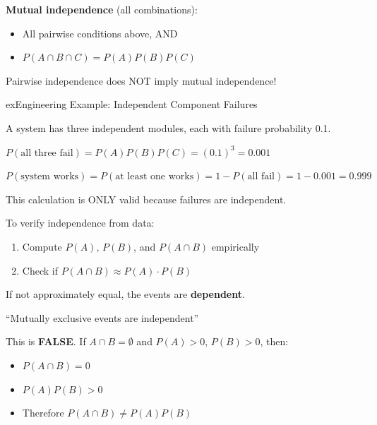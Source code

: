 \textbf{Mutual independence} (all combinations):

\begin{itemize}
\tightlist
\item
  All pairwise conditions above, AND
\item
  $P(A \cap B \cap C) = P(A)P(B)P(C)$
\end{itemize}

\begin{PSquote}

\PSwarn{} Pairwise independence does NOT imply mutual independence!

\end{PSquote}

\begin{PSbox}[unbreakable]{ex}{Engineering Example: Independent Component Failures}

A system has three independent modules, each with failure probability 0.1.

$P(\text{all three fail}) = P(A)P(B)P(C) = (0.1)^{3} = 0.001$

$P(\text{system works}) = P(\text{at least one works}) = 1 - P(\text{all fail}) = 1 - 0.001 = 0.999$

This calculation is ONLY valid because failures are independent.

\end{PSbox}


To verify independence from data:

\begin{enumerate}
\def\labelenumi{\arabic{enumi}.}
\tightlist
\item
  Compute $P(A),\, P(B)$, and $P(A \cap B)$ empirically
\item
  Check if $P(A \cap B) \approx P(A) \cdot P(B)$
\end{enumerate}

If not approximately equal, the events are \textbf{dependent}.


\begin{PSquote}

\PSno{} ``Mutually exclusive events are independent''

\end{PSquote}

This is \textbf{FALSE}. If $A \cap B = \emptyset$ and $P(A) > 0,\, P(B) > 0$, then:

\begin{itemize}
\tightlist
\item
  $P(A \cap B) = 0$
\item
  $P(A)P(B) > 0$
\item
  Therefore $P(A \cap B) \ne P(A)P(B)$
\end{itemize}

